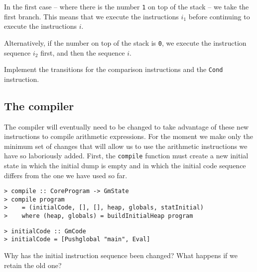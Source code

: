 \gmruled%
{}%
{}

In the first case -- where there is the number \mbox{\tt 1} on top of the stack
-- we take the first branch. This means that we execute the
instructions $i_1$ before continuing to execute the instructions $i$.

\gmruled%
{}%
{}

Alternatively, if the number on top of the stack is \mbox{\tt 0}, we execute
the instruction sequence $i_2$ first, and then the sequence $i$.

\begin{exercise}
Implement the transitions for the comparison instructions and the
\mbox{\tt Cond} instruction.
\end{exercise}

\subsection{The compiler}

The compiler will eventually need to be changed to take advantage of
these new instructions to compile arithmetic expressions. For the
moment we make only the minimum set of changes that will allow us to
use the arithmetic instructions we have so laboriously added. First, the
\mbox{\tt compile} function must create a new initial state in which the
initial dump is empty and in which the initial code sequence differs
from the one we have used so far.
\begin{verbatim}
> compile :: CoreProgram -> GmState
> compile program
>    = (initialCode, [], [], heap, globals, statInitial)
>    where (heap, globals) = buildInitialHeap program
\end{verbatim}
%
%
\begin{verbatim}
> initialCode :: GmCode
> initialCode = [Pushglobal "main", Eval]
\end{verbatim}
%
%
\begin{exercise}\label{gm:X:evalForUnwind}
Why has the initial instruction sequence been changed? What happens if
we retain the old one?
\end{exercise}

